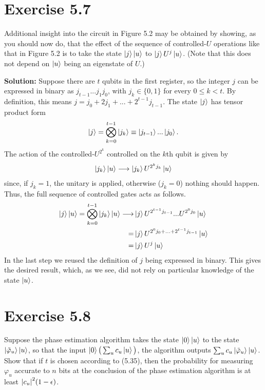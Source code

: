 \documentclass{book}
\begin{document}
\section*{Exercise 5.7}
    Additional insight into the circuit in Figure 5.2 may be obtained by showing, as you should now do, that the effect of the sequence of controlled-$U$ operations like that in Figure 5.2 is to take the state $\ket{j}\ket{u}$ to $\ket{j}U^j\ket{u}$. (Note that this does not depend on $\ket{u}$ being an eigenstate of $U$.)

    \textbf{Solution:} Suppose there are $t$ qubits in the first register, so the integer $j$ can be expressed in binary as $j_{t-1}...j_1j_0$, with $j_k \in \{0,1\}$ for every $0\leq k < t$. By definition, this means $j = j_0 + 2j_1 + ... + 2^{t-1}j_{t-1}$. The state $\ket{j}$ has tensor product form
    \begin{align}
        \ket{j} = \bigotimes_{k=0}^{t-1} \ket{j_k} \equiv \ket{j_{t-1}}...\ket{j_{0}}.
    \end{align}
    The action of the controlled-$U^{2^k}$ controlled on the $k$th qubit is given by
    \begin{align}
        \ket{j_k}\ket{u} \longrightarrow  \ket{j_k} U^{2^k j_k}\ket{u}
    \end{align}
    since, if $j_k = 1$, the unitary is applied, otherwise ($j_k = 0$) nothing should happen. Thus, the full sequence of controlled gates acts as follows.
    \begin{align}
    \begin{aligned}
        \ket{j}\ket{u} = \bigotimes_{k=0}^{t-1} \ket{j_k}\ket{u} \longrightarrow &\ket{j}U^{2^{t-1}j_{t-1}}...U^{2^0 j_0}\ket{u} \\
        = &\ket{j}U^{2^0 j_0 + ... + 2^{t-1} j_{t-1}}\ket{u} \\
        = &\ket{j}U^j\ket{u}
    \end{aligned}
    \end{align}
    In the last step we reused the definition of $j$ being expressed in binary. This gives the desired result, which, as we see, did not rely on particular knowledge of the state $\ket{u}$.

\section*{Exercise 5.8}
    Suppose the phase estimation algorithm takes the state $\ket{0}\ket{u}$ to the state $\ket{\tilde{\varphi}_u}\ket{u}$, so that the input $\ket{0}\big(\sum_u c_u\ket{u}\big)$, the algorithm outputs $\sum_u c_u\ket{\tilde{\varphi}_u}\ket{u}$. Show that if $t$ is chosen according to (5.35), then the probability for measuring $\varphi_u$ accurate to $n$ bits at the conclusion of the phase estimation algorithm is at least $\abs{c_u}^2(1-\epsilon)$.
\end{document}
